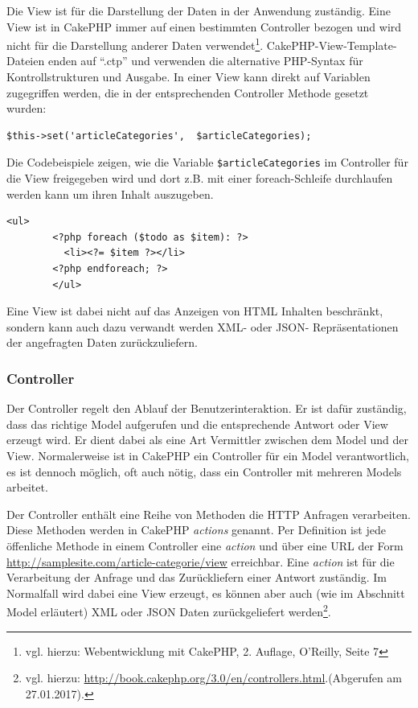 	Die View ist für die Darstellung der Daten in der Anwendung zuständig. Eine View ist in CakePHP immer auf einen bestimmten Controller bezogen und wird nicht für die Darstellung anderer Daten verwendet\footnote{vgl. hierzu: Webentwicklung mit CakePHP, 2. Auflage, O'Reilly, Seite 7}. CakePHP-View-Template-Dateien enden auf \enquote{.ctp} und verwenden die alternative PHP-Syntax für Kontrollstrukturen und Ausgabe. 
	In einer View kann direkt auf Variablen zugegriffen werden, die in der entsprechenden Controller Methode gesetzt wurden:\\ 
   \lstset{language=PHP} 
	\begin{lstlisting}[caption={Freigabe einer Controllervariablen für die View}] 
	$this->set('articleCategories',  $articleCategories);
	\end{lstlisting}
	  Die Codebeispiele zeigen, wie die Variable \texttt{\$articleCategories} im Controller für die View freigegeben wird und dort z.B. mit einer foreach-Schleife durchlaufen werden kann um ihren Inhalt auszugeben. 
		\lstset{language=PHP}
		\begin{lstlisting}[caption={Alternative PHP Syntax}] 	
		<ul>
	   	<?php foreach ($todo as $item): ?>
		  <li><?= $item ?></li>
		<?php endforeach; ?>
		</ul>
		\end{lstlisting}
	 Eine View ist dabei nicht auf das Anzeigen von HTML Inhalten beschränkt, sondern kann auch dazu verwandt werden XML- oder JSON- Repräsentationen der angefragten Daten zurückzuliefern.
	\subsubsection{Controller}
	Der Controller regelt den Ablauf der Benutzerinteraktion.
	Er ist dafür zuständig, dass das richtige Model aufgerufen und die entsprechende Antwort oder View erzeugt wird. Er dient dabei als eine Art Vermittler zwischen dem Model und der View. Normalerweise ist in CakePHP ein Controller für ein Model verantwortlich, es ist dennoch möglich, oft auch nötig, dass ein Controller mit mehreren Models arbeitet.
	
	Der Controller enthält eine Reihe von  Methoden die HTTP Anfragen verarbeiten. Diese Methoden werden in CakePHP \textit{actions} genannt. Per Definition ist jede öffenliche Methode in einem Controller eine \textit{action} und über eine URL der Form \url{http://samplesite.com/article-categorie/view} erreichbar.
	Eine \textit{action} ist für die Verarbeitung der Anfrage und das Zurückliefern einer Antwort zuständig. Im Normalfall wird dabei eine View erzeugt, es können aber auch (wie im Abschnitt Model erläutert) XML oder JSON Daten zurückgeliefert werden\footnote{vgl. hierzu: \url{http://book.cakephp.org/3.0/en/controllers.html}.(Abgerufen am 27.01.2017).}.
	 
